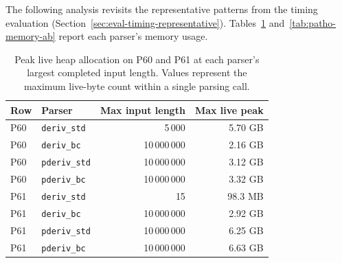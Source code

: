The following analysis revisits the representative
patterns from the timing evaluation
(Section~\ref{sec:eval-timing-representative}).
Tables~\ref{tab:patho-memory-e}
and~\ref{tab:patho-memory-ab}
report each parser's memory usage.


\begin{table}[H]
\centering
\small
\setlength{\tabcolsep}{4pt}
\begin{tabular*}{\textwidth}{@{\extracolsep{\fill}} llrr}
\hline
Row & Parser & Max input length & Max live peak \\
\hline
P60 & \texttt{deriv\_std}               &       5\,000 & 5.70 GB \\
P60 & \texttt{deriv\_bc}                      & 10\,000\,000 & 2.16 GB \\
P60 & \texttt{pderiv\_std}                    & 10\,000\,000 & 3.12 GB \\
P60 & \texttt{pderiv\_bc}                     & 10\,000\,000 & 3.32 GB \\
\hline
P61 & \texttt{deriv\_std}               &         15 &  98.3 MB \\
P61 & \texttt{deriv\_bc}                      & 10\,000\,000 & 2.92 GB \\
P61 & \texttt{pderiv\_std}                    & 10\,000\,000 & 6.25 GB \\
P61 & \texttt{pderiv\_bc}                     & 10\,000\,000 & 6.63 GB \\
\hline
\end{tabular*}
\caption{Peak live heap allocation on P60 and P61
at each parser's largest completed input length.
Values represent the maximum live-byte count
within a single parsing call.}
\label{tab:patho-memory-e}
\end{table}

